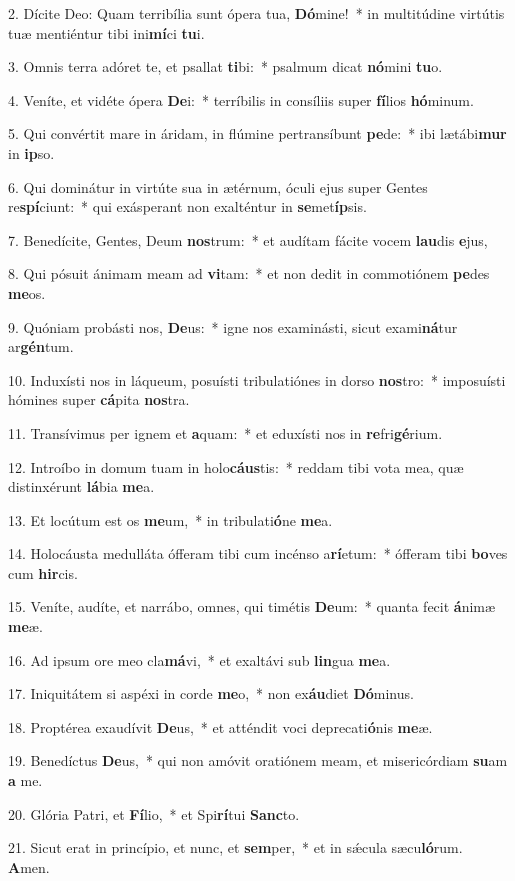 2. Dícite Deo: Quam terribília sunt ópera tua, \textbf{Dó}mine!~*  in multitúdine virtútis tuæ mentiéntur tibi ini\textbf{mí}ci \textbf{tu}i.\

3. Omnis terra adóret te, et psallat \textbf{ti}bi:~*  psalmum dicat \textbf{nó}mini \textbf{tu}o.\

4. Veníte, et vidéte ópera \textbf{De}i:~*  terríbilis in consíliis super \textbf{fí}lios \textbf{hó}minum.\

5. Qui convértit mare in áridam, in flúmine pertransíbunt \textbf{pe}de:~*  ibi lætábi\textbf{mur} in \textbf{ip}so.\

6. Qui dominátur in virtúte sua in ætérnum, óculi ejus super Gentes re\textbf{spí}ciunt:~*  qui exásperant non exalténtur in \textbf{se}met\textbf{íp}sis.\

7. Benedícite, Gentes, Deum \textbf{nos}trum:~*  et audítam fácite vocem \textbf{lau}dis \textbf{e}jus,\

8. Qui pósuit ánimam meam ad \textbf{vi}tam:~*  et non dedit in commotiónem \textbf{pe}des \textbf{me}os.\

9. Quóniam probásti nos, \textbf{De}us:~*  igne nos examinásti, sicut exami\textbf{ná}tur ar\textbf{gén}tum.\

10. Induxísti nos in láqueum, posuísti tribulatiónes in dorso \textbf{nos}tro:~*  imposuísti hómines super \textbf{cá}pita \textbf{nos}tra.\

11. Transívimus per ignem et \textbf{a}quam:~*  et eduxísti nos in \textbf{re}fri\textbf{gé}rium.\

12. Introíbo in domum tuam in holo\textbf{cáus}tis:~*  reddam tibi vota mea, quæ distinxérunt \textbf{lá}bia \textbf{me}a.\

13. Et locútum est os \textbf{me}um,~*  in tribulati\textbf{ó}ne \textbf{me}a.\

14. Holocáusta medulláta ófferam tibi cum incénso a\textbf{rí}etum:~*  ófferam tibi \textbf{bo}ves cum \textbf{hir}cis.\

15. Veníte, audíte, et narrábo, omnes, qui timétis \textbf{De}um:~*  quanta fecit \textbf{á}nimæ \textbf{me}æ.\

16. Ad ipsum ore meo cla\textbf{má}vi,~*  et exaltávi sub \textbf{lin}gua \textbf{me}a.\

17. Iniquitátem si aspéxi in corde \textbf{me}o,~*  non ex\textbf{áu}diet \textbf{Dó}minus.\

18. Proptérea exaudívit \textbf{De}us,~*  et atténdit voci deprecati\textbf{ó}nis \textbf{me}æ.\

19. Benedíctus \textbf{De}us,~*  qui non amóvit oratiónem meam, et misericórdiam \textbf{su}am \textbf{a} me.\

20. Glória Patri, et \textbf{Fí}lio,~*  et Spi\textbf{rí}tui \textbf{Sanc}to.\

21. Sicut erat in princípio, et nunc, et \textbf{sem}per,~*  et in sǽcula sæcu\textbf{ló}rum. \textbf{A}men.\

